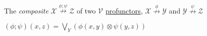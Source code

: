 The \emph{composite} $\mathcal{X}\overset{\phi;\psi}\nrightarrow \mathcal{Z}$ of two $\mathcal{V}$ \href{doc/1 math/Seven Sketches in Compositionality/Chapter 4: Co-design/2 Enriched profunctors/2 V-profunctors/1 V-profunctor}{profunctors}, $\mathcal{X}\overset{\phi}\nrightarrow\mathcal{Y}$ and $\mathcal{Y}\overset{\psi}\nrightarrow\mathcal{Z}$

$(\phi;\psi)(x,z) = \bigvee_Y(\phi(x,y)\otimes\psi(y,z))$
